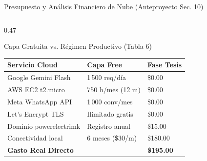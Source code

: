 \documentclass[aspectratio=169, 10pt]{beamer}
\begin{document}
\begin{frame}{Presupuesto y Análisis Financiero de Nube (Anteproyecto Sec. 10)}
\begin{columns}[t]
    \begin{column}{0.47\textwidth}
      \begin{block}{Capa Gratuita vs. Régimen Productivo (Tabla 6)}
        \scriptsize
        \setlength{\tabcolsep}{2.5pt}
        \renewcommand{\arraystretch}{0.95}
        \begin{tabular}{p{2.3cm} p{1.6cm} p{1.5cm}}
          \toprule
          \textbf{Servicio Cloud} & \textbf{Capa Free} & \textbf{Fase Tesis} \\
          \midrule
          Google Gemini Flash & 1\,500 req/día & \$0.00 \\
          AWS EC2 t2.micro & 750 h/mes (12 m) & \$0.00 \\
          Meta WhatsApp API & 1\,000 conv/mes & \$0.00 \\
          Let's Encrypt TLS & Ilimitado gratis & \$0.00 \\
          Dominio powerelectrimk & Registro anual & \$15.00 \\
          Conectividad local & 6 meses (\$30/m) & \$180.00 \\
          \midrule
          \textbf{Gasto Real Directo} & & \textbf{\$195.00} \\
          \bottomrule
        \end{tabular}
      \end{block}
    \end{column}
  \end{columns}
\end{frame}
\end{document}
